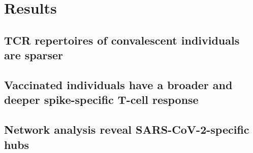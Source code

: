 \chapter{Results}

\section*{TCR repertoires of convalescent individuals are sparser}

\section*{Vaccinated individuals have a broader and deeper spike-specific T-cell response}

\section*{Network analysis reveal SARS-CoV-2-specific hubs}
